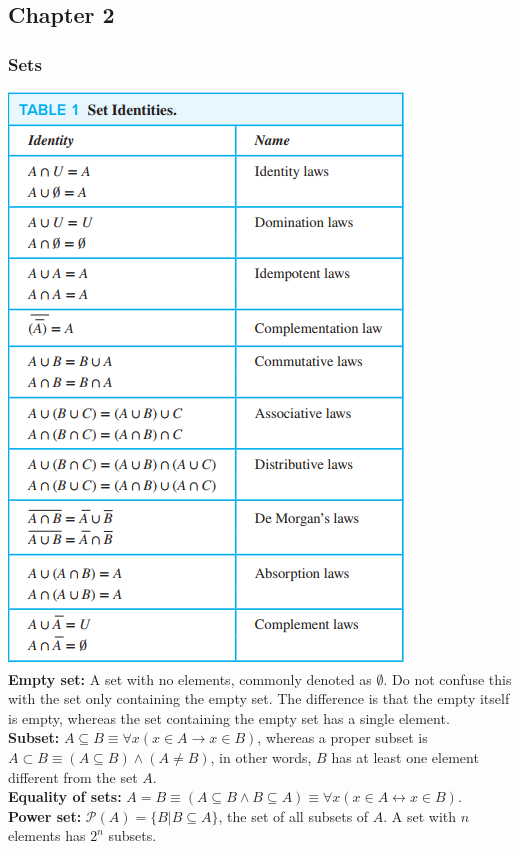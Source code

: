 \documentclass[12pt]{article}
\newcommand{\PP}{\mathscr{P}}
\begin{document}
\subsection{Chapter 2}
\subsubsection{Sets}
\includegraphics[scale=0.8]{set_identities} \\
\textbf{Empty set:} A set with no elements, commonly denoted as $\emptyset$. Do not confuse this with the set only containing the empty set. The difference is that the empty itself is empty, whereas the set containing the empty set has a single element. \\
\textbf{Subset:} $A \subseteq B \equiv \forall x(x \in A \rightarrow x \in B)$, whereas a proper subset is $ A \subset B \equiv (A \subseteq B) \wedge (A \neq B)$, in other words, $B$ has at least one element different from the set $A$. \\
\textbf{Equality of sets:} $A = B \equiv (A \subseteq B \wedge B \subseteq A) \equiv \forall x(x \in A \leftrightarrow x \in B)$. \\
\textbf{Power set:} $\PP(A) = \{B | B \subseteq A \}$, the set of all subsets of $A$. A set with $n$ elements has $2^n$ subsets. \\
\end{document}
